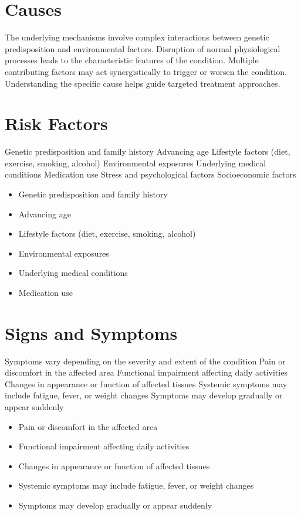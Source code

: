 \section{Causes}
The underlying mechanisms involve complex interactions between genetic predisposition and environmental factors. Disruption of normal physiological processes leads to the characteristic features of the condition. Multiple contributing factors may act synergistically to trigger or worsen the condition. Understanding the specific cause helps guide targeted treatment approaches.
\section{Risk Factors}
Genetic predisposition and family history Advancing age Lifestyle factors (diet, exercise, smoking, alcohol) Environmental exposures Underlying medical conditions Medication use Stress and psychological factors Socioeconomic factors

\begin{itemize}[noitemsep]
  \item Genetic predisposition and family history
  \item Advancing age
  \item Lifestyle factors (diet, exercise, smoking, alcohol)
  \item Environmental exposures
  \item Underlying medical conditions
  \item Medication use
\end{itemize}
\section{Signs and Symptoms}
Symptoms vary depending on the severity and extent of the condition Pain or discomfort in the affected area Functional impairment affecting daily activities Changes in appearance or function of affected tissues Systemic symptoms may include fatigue, fever, or weight changes Symptoms may develop gradually or appear suddenly

\begin{itemize}[noitemsep]
  \item Pain or discomfort in the affected area
  \item Functional impairment affecting daily activities
  \item Changes in appearance or function of affected tissues
  \item Systemic symptoms may include fatigue, fever, or weight changes
  \item Symptoms may develop gradually or appear suddenly
\end{itemize}
